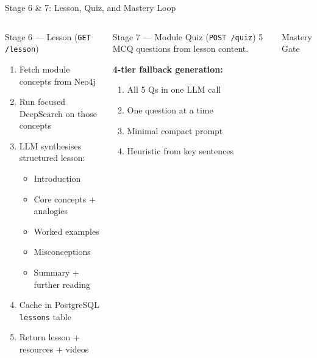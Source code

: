 \documentclass[aspectratio=169,9pt]{beamer}
\begin{document}
\begin{frame}{Stage 6 \& 7: Lesson, Quiz, and Mastery Loop}
\begin{columns}[T]
  \begin{block}{Stage 6 — Lesson (\texttt{GET /lesson})}
    \begin{enumerate}
      \item Fetch module concepts from Neo4j
      \item Run focused DeepSearch on those concepts
      \item LLM synthesises structured lesson:
        \begin{itemize}
          \item Introduction
          \item Core concepts + analogies
          \item Worked examples
          \item Misconceptions
          \item Summary + further reading
        \end{itemize}
      \item Cache in PostgreSQL \texttt{lessons} table
      \item Return lesson + resources + videos
    \end{enumerate}
  \end{block}

  \begin{block}{Stage 7 — Module Quiz (\texttt{POST /quiz})}
    5 MCQ questions from lesson content.

    \medskip
    \textbf{4-tier fallback generation:}
    \begin{enumerate}
      \item All 5 Qs in one LLM call
      \item One question at a time
      \item Minimal compact prompt
      \item Heuristic from key sentences
    \end{enumerate}
  \end{block}

  \begin{block}{Mastery Gate}
    \begin{center}
    \end{center}
  \end{block}
\end{columns}
\end{frame}
\end{document}
